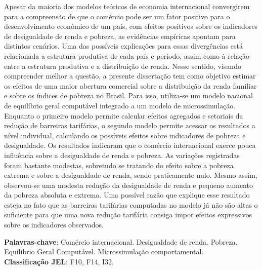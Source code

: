 

\begin{resumo}
	\SingleSpacing
	
	Apesar da maioria dos modelos teóricos de economia internacional convergirem para a compreensão de que o comércio pode ser um fator positivo para o desenvolvimento econômico de um país, com efeitos positivos sobre os indicadores de desigualdade de renda e pobreza, as evidências empíricas apontam para distintos cenários. Uma das possíveis explicações para essas divergências está relacionada a estrutura produtiva de cada país e período, assim como à relação entre a estrutura produtiva e a distribuição de renda. Nesse sentido, visando compreender melhor a questão, a presente dissertação tem como objetivo estimar os efeitos de uma maior abertura comercial sobre a distribuição da renda familiar e sobre os índices de pobreza no Brasil. Para isso, utiliza-se um modelo nacional de equilíbrio geral computável integrado a um modelo de microssimulação. Enquanto o primeiro modelo permite calcular efeitos agregados e setoriais da redução de barreiras tarifárias, o segundo modelo permite acessar os resultados a nível individual, calculando os possíveis efeitos sobre indicadores de pobreza e desigualdade. Os resultados indicaram que o comércio internacional exerce pouca influência sobre a desigualdade de renda e pobreza. As variações registradas foram bastante modestas, sobretudo se tratando do efeito sobre a pobreza extrema e sobre a desigualdade de renda, sendo praticamente nulo. Mesmo assim, observou-se uma modesta redução da desigualdade de renda e pequeno aumento da pobreza absoluta e extrema. Uma possível razão que explique esse resultado esteja no fato que as barreiras tarifárias computadas no modelo já não são altas o suficiente para que uma nova redução tarifária consiga impor efeitos expressivos sobre os indicadores observados.
	
	\noindent 
	\textbf{Palavras-chave}: Comércio internacional. Desigualdade de renda. Pobreza. Equilíbrio Geral Computável. Microssimulação comportamental. \\
	\textbf{Classificação JEL}: F10, F14, I32.
\end{resumo}



